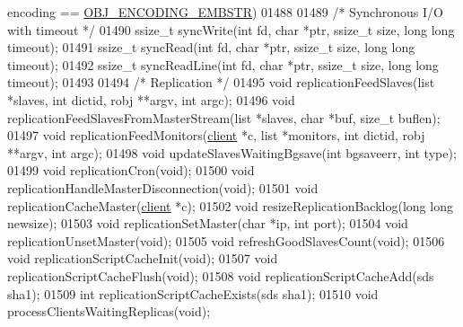 \begin{DoxyCode}
{{{{{{{{      encoding} \textcolor{preprocessor}{==} \hyperlink{server_8h_ac5bb76b546161fd0da4b0ff89b3142ee}{OBJ\_ENCODING\_EMBSTR}\textcolor{preprocessor}{)}
01488 
01489 \textcolor{comment}{/* Synchronous I/O with timeout */}
01490 ssize\_t syncWrite(\textcolor{keywordtype}{int} fd, \textcolor{keywordtype}{char} *ptr, ssize\_t size, \textcolor{keywordtype}{long} \textcolor{keywordtype}{long} timeout);
01491 ssize\_t syncRead(\textcolor{keywordtype}{int} fd, \textcolor{keywordtype}{char} *ptr, ssize\_t size, \textcolor{keywordtype}{long} \textcolor{keywordtype}{long} timeout);
01492 ssize\_t syncReadLine(\textcolor{keywordtype}{int} fd, \textcolor{keywordtype}{char} *ptr, ssize\_t size, \textcolor{keywordtype}{long} \textcolor{keywordtype}{long} timeout);
01493 
01494 \textcolor{comment}{/* Replication */}
01495 \textcolor{keywordtype}{void} replicationFeedSlaves(list *slaves, \textcolor{keywordtype}{int} dictid, robj **argv, \textcolor{keywordtype}{int} argc);
01496 \textcolor{keywordtype}{void} replicationFeedSlavesFromMasterStream(list *slaves, \textcolor{keywordtype}{char} *buf, size\_t buflen);
01497 \textcolor{keywordtype}{void} replicationFeedMonitors(\hyperlink{structclient}{client} *c, list *monitors, \textcolor{keywordtype}{int} dictid, robj **argv, \textcolor{keywordtype}{int} argc);
01498 \textcolor{keywordtype}{void} updateSlavesWaitingBgsave(\textcolor{keywordtype}{int} bgsaveerr, \textcolor{keywordtype}{int} type);
01499 \textcolor{keywordtype}{void} replicationCron(\textcolor{keywordtype}{void});
01500 \textcolor{keywordtype}{void} replicationHandleMasterDisconnection(\textcolor{keywordtype}{void});
01501 \textcolor{keywordtype}{void} replicationCacheMaster(\hyperlink{structclient}{client} *c);
01502 \textcolor{keywordtype}{void} resizeReplicationBacklog(\textcolor{keywordtype}{long} \textcolor{keywordtype}{long} newsize);
01503 \textcolor{keywordtype}{void} replicationSetMaster(\textcolor{keywordtype}{char} *ip, \textcolor{keywordtype}{int} port);
01504 \textcolor{keywordtype}{void} replicationUnsetMaster(\textcolor{keywordtype}{void});
01505 \textcolor{keywordtype}{void} refreshGoodSlavesCount(\textcolor{keywordtype}{void});
01506 \textcolor{keywordtype}{void} replicationScriptCacheInit(\textcolor{keywordtype}{void});
01507 \textcolor{keywordtype}{void} replicationScriptCacheFlush(\textcolor{keywordtype}{void});
01508 \textcolor{keywordtype}{void} replicationScriptCacheAdd(sds sha1);
01509 \textcolor{keywordtype}{int} replicationScriptCacheExists(sds sha1);
01510 \textcolor{keywordtype}{void} processClientsWaitingReplicas(\textcolor{keywordtype}{void});
}}}}}}}
\end{DoxyCode}
